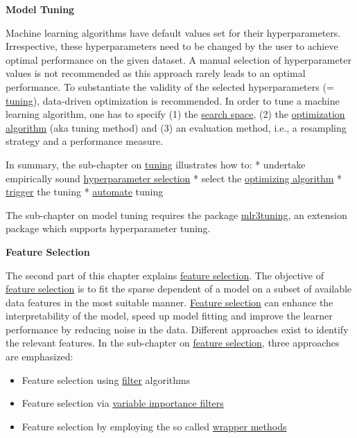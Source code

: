 \documentclass[]{article}
\providecommand{\tightlist}{%
  \setlength{\itemsep}{0pt}\setlength{\parskip}{0pt}}
\begin{document}
\textbf{Model Tuning}

Machine learning algorithms have default values set for their hyperparameters.
Irrespective, these hyperparameters need to be changed by the user to achieve optimal performance on the given dataset.
A manual selection of hyperparameter values is not recommended as this approach rarely leads to an optimal performance.
To substantiate the validity of the selected hyperparameters (= \protect\hyperlink{tuning}{tuning}), data-driven optimization is recommended.
In order to tune a machine learning algorithm, one has to specify (1) the \protect\hyperlink{tuning-optimization}{search space}, (2) the \protect\hyperlink{tuning-optimization}{optimization algorithm} (aka tuning method) and (3) an evaluation method, i.e., a resampling strategy and a performance measure.

In summary, the sub-chapter on \protect\hyperlink{tuning}{tuning} illustrates how to:
* undertake empirically sound \protect\hyperlink{tuning}{hyperparameter selection}
* select the \protect\hyperlink{tuning-optimization}{optimizing algorithm}
* \protect\hyperlink{tuning-triggering}{trigger} the tuning
* \protect\hyperlink{autotuner}{automate} tuning

The sub-chapter on model tuning requires the package \href{https://mlr3tuning.mlr-org.com}{mlr3tuning}, an extension package which supports hyperparameter tuning.

\textbf{Feature Selection}

The second part of this chapter explains \protect\hyperlink{fs}{feature selection}.
The objective of \protect\hyperlink{fs}{feature selection} is to fit the sparse dependent of a model on a subset of available data features in the most suitable manner.
\protect\hyperlink{fs}{Feature selection} can enhance the interpretability of the model, speed up model fitting and improve the learner performance by reducing noise in the data.
Different approaches exist to identify the relevant features.
In the sub-chapter on \protect\hyperlink{fs}{feature selection}, three approaches are emphasized:

\begin{itemize}
\tightlist
\item
  Feature selection using \protect\hyperlink{fs-filter}{filter} algorithms
\item
  Feature selection via \protect\hyperlink{fs-var-imp-filter}{variable importance filters}
\item
  Feature selection by employing the so called \protect\hyperlink{fs-wrapper}{wrapper methods}
\end{itemize}
\end{document}
